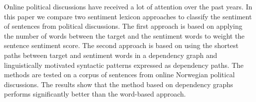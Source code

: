 Online political discussions have received a lot of attention over the past years. In this paper we compare two sentiment lexicon approaches to classify the sentiment of sentences from political discussions. The first approach is based on applying the number of words between the target and the sentiment words to weight the sentence sentiment score. The second approach is based on using the shortest paths between target and sentiment words in a dependency graph and linguistically motivated syntactic patterns expressed as dependency paths. The methods are tested on a corpus of sentences from online Norwegian political discussions. The results show that the method based on dependency graphs performs significantly better than the word-based approach.
